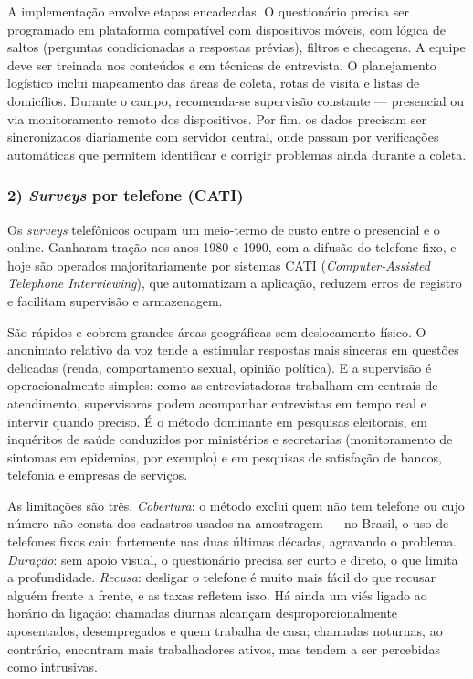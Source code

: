\documentclass[12pt, a4paper, openany]{book}
\begin{document}
A implementa\c{c}\~ao envolve etapas encadeadas. O question\'ario precisa ser programado em plataforma compat\'ivel com dispositivos m\'oveis, com l\'ogica de saltos (perguntas condicionadas a respostas pr\'evias), filtros e checagens. A equipe deve ser treinada nos conte\'udos e em t\'ecnicas de entrevista. O planejamento log\'istico inclui mapeamento das \'areas de coleta, rotas de visita e listas de domic\'ilios. Durante o campo, recomenda-se supervis\~ao constante --- presencial ou via monitoramento remoto dos dispositivos. Por fim, os dados precisam ser sincronizados diariamente com servidor central, onde passam por verifica\c{c}\~oes autom\'aticas que permitem identificar e corrigir problemas ainda durante a coleta.

\subsubsection*{2) \textit{Surveys} por telefone (CATI)}

Os \textit{surveys} telef\^onicos ocupam um meio-termo de custo entre o presencial e o online. Ganharam tra\c{c}\~ao nos anos 1980 e 1990, com a difus\~ao do telefone fixo, e hoje s\~ao operados majoritariamente por sistemas CATI (\textit{Computer-Assisted Telephone Interviewing}), que automatizam a aplica\c{c}\~ao, reduzem erros de registro e facilitam supervis\~ao e armazenagem.

S\~ao r\'apidos e cobrem grandes \'areas geogr\'aficas sem deslocamento f\'isico. O anonimato relativo da voz tende a estimular respostas mais sinceras em quest\~oes delicadas (renda, comportamento sexual, opini\~ao pol\'itica). E a supervis\~ao \'e operacionalmente simples: como as entrevistadoras trabalham em centrais de atendimento, supervisoras podem acompanhar entrevistas em tempo real e intervir quando preciso. \'E o m\'etodo dominante em pesquisas eleitorais, em inqu\'eritos de sa\'ude conduzidos por minist\'erios e secretarias (monitoramento de sintomas em epidemias, por exemplo) e em pesquisas de satisfa\c{c}\~ao de bancos, telefonia e empresas de servi\c{c}os.

As limita\c{c}\~oes s\~ao tr\^es. \textit{Cobertura}: o m\'etodo exclui quem n\~ao tem telefone ou cujo n\'umero n\~ao consta dos cadastros usados na amostragem --- no Brasil, o uso de telefones fixos caiu fortemente nas duas \'ultimas d\'ecadas, agravando o problema. \textit{Dura\c{c}\~ao}: sem apoio visual, o question\'ario precisa ser curto e direto, o que limita a profundidade. \textit{Recusa}: desligar o telefone \'e muito mais f\'acil do que recusar algu\'em frente a frente, e as taxas refletem isso. H\'a ainda um vi\'es ligado ao hor\'ario da liga\c{c}\~ao: chamadas diurnas alcan\c{c}am desproporcionalmente aposentados, desempregados e quem trabalha de casa; chamadas noturnas, ao contr\'ario, encontram mais trabalhadores ativos, mas tendem a ser percebidas como intrusivas.
\end{document}
